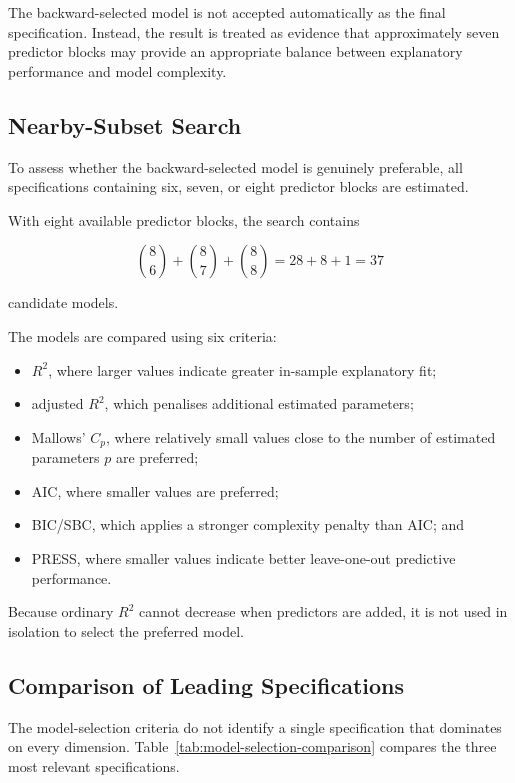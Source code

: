 \documentclass[11pt,a4paper]{article}
\begin{document}
The backward-selected model is not accepted automatically as the final specification. Instead, the result is treated as evidence that approximately seven predictor blocks may provide an appropriate balance between explanatory performance and model complexity.

\subsection{Nearby-Subset Search}

To assess whether the backward-selected model is genuinely preferable, all specifications containing six, seven, or eight predictor blocks are estimated.

With eight available predictor blocks, the search contains

\[
\binom{8}{6}+\binom{8}{7}+\binom{8}{8}
=
28+8+1
=
37
\]

candidate models.

The models are compared using six criteria:

\begin{itemize}
    \item \(R^2\), where larger values indicate greater in-sample explanatory fit;
    \item adjusted \(R^2\), which penalises additional estimated parameters;
    \item Mallows' \(C_p\), where relatively small values close to the number of estimated parameters \(p\) are preferred;
    \item AIC, where smaller values are preferred;
    \item BIC/SBC, which applies a stronger complexity penalty than AIC; and
    \item PRESS, where smaller values indicate better leave-one-out predictive performance.
\end{itemize}

Because ordinary \(R^2\) cannot decrease when predictors are added, it is not used in isolation to select the preferred model.

\subsection{Comparison of Leading Specifications}

The model-selection criteria do not identify a single specification that dominates on every dimension. Table~\ref{tab:model-selection-comparison} compares the three most relevant specifications.
\end{document}
